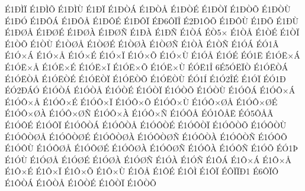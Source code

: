 {^^c91^^d0^^cc^^cf
^^c91^^d0^^cc^^d5
^^c91^^d0^^cc^^d9
^^c91^^d0^^cf
^^c91^^d0^^d2^^c1
^^c91^^d0^^d2^^c5
^^c91^^d0^^d2^^c9
^^c91^^d0^^d2^^cf
^^c91^^d0^^d2^^d5
^^c91^^d0^^d2^^d9
^^c91^^d0^^d3
^^c91^^d0^^d4^^c1
^^c91^^d0^^d4^^c5
^^c91^^d0^^d4^^c9
^^c91^^d0^^d4^^cf
^^c9^^d06^^d4^^cf^^ce
^^c92^^d01^^d4^^d5
^^c91^^d0^^d4^^d9
^^c91^^d0^^d5
^^c91^^d0^^d9
^^c91^^d0^^d8^^c5
^^c91^^d0^^d8^^c9
^^c91^^d0^^d8^^c0
^^c91^^d0^^d8^^d1
^^c91^^d0^^c0
^^c91^^d0^^d1
^^c91^^d2^^c1
^^c9^^d25^^d7
^^c91^^d2^^c5
^^c91^^d2^^c9
^^c91^^d2^^cf
^^c91^^d2^^d5
^^c91^^d2^^d9
^^c91^^d2^^d8^^c5
^^c91^^d2^^d8^^c9
^^c91^^d2^^d8^^c0
^^c91^^d2^^d8^^d1
^^c91^^d2^^c0
^^c91^^d2^^d1
^^c91^^d3^^c1
^^c9^^d31^^c2
^^c91^^d3^^d7^^c1
^^c91^^d3^^d7^^c5
^^c91^^d3^^d7^^c9
^^c91^^d3^^d7^^cf
^^c91^^d3^^d7^^d5
^^c91^^d3^^d7^^d9
^^c91^^d3^^c5
^^c91^^d3^^c9
^^c9^^d31^^cb
^^c91^^d3^^cb^^d7^^c1
^^c91^^d3^^cb^^d7^^c5
^^c91^^d3^^cb^^d7^^c9
^^c91^^d3^^cb^^d7^^cf
^^c91^^d3^^cb^^d7^^d5
^^c91^^d3^^cb^^d7^^d9
^^c9^^d3^^cb1^^ce
6^^c95^^d3^^cb^^cf^^d2
^^c91^^d3^^cb^^d2^^c1
^^c91^^d3^^cb^^d2^^c5
^^c91^^d3^^cb^^d2^^c9
^^c91^^d3^^cb^^d2^^cf
^^c91^^d3^^cb^^d2^^d5
^^c91^^d3^^cb^^d2^^d9
^^c9^^d31^^cd
^^c91^^d32^^ce^^c9
^^c91^^d3^^cf
^^c9^^d31^^d0
^^c9^^d32^^d0^^c1^^d3
^^c91^^d3^^d2^^c1
^^c91^^d3^^d2^^c5
^^c91^^d3^^d2^^c9
^^c91^^d3^^d2^^cf
^^c91^^d3^^d2^^d5
^^c91^^d3^^d2^^d9
^^c91^^d3^^d4^^c1
^^c91^^d3^^d4^^d7^^c1
^^c91^^d3^^d4^^d7^^c5
^^c91^^d3^^d4^^d7^^c9
^^c91^^d3^^d4^^d7^^cf
^^c91^^d3^^d4^^d7^^d5
^^c91^^d3^^d4^^d7^^d9
^^c91^^d3^^d4^^d7^^d8^^c5
^^c91^^d3^^d4^^d7^^d8^^c9
^^c91^^d3^^d4^^d7^^d8^^c0
^^c91^^d3^^d4^^d7^^d8^^d1
^^c91^^d3^^d4^^d7^^c0
^^c91^^d3^^d4^^d7^^d1
^^c91^^d3^^d4^^c5
^^c9^^d31^^d4^^c5^^cb
^^c9^^d35^^d4^^c5^^c3
^^c91^^d3^^d4^^c9
^^c91^^d3^^d4^^cf
^^c91^^d3^^d4^^d2^^c1
^^c91^^d3^^d4^^d2^^c5
^^c91^^d3^^d4^^d2^^c9
^^c91^^d3^^d4^^d2^^cf
^^c91^^d3^^d4^^d2^^d5
^^c91^^d3^^d4^^d2^^d9
^^c91^^d3^^d4^^d2^^d8^^c5
^^c91^^d3^^d4^^d2^^d8^^c9
^^c91^^d3^^d4^^d2^^d8^^c0
^^c91^^d3^^d4^^d2^^d8^^d1
^^c91^^d3^^d4^^d2^^c0
^^c91^^d3^^d4^^d2^^d1
^^c91^^d3^^d4^^d5
^^c91^^d3^^d4^^d9
^^c91^^d3^^d4^^d8^^c5
^^c91^^d3^^d4^^d8^^c9
^^c91^^d3^^d4^^d8^^c0
^^c91^^d3^^d4^^d8^^d1
^^c91^^d3^^d4^^c0
^^c91^^d3^^d4^^d1
^^c91^^d3^^d5
^^c9^^d31^^de
^^c91^^d3^^d9
^^c91^^d3^^d8^^c5
^^c91^^d3^^d8^^c9
^^c91^^d3^^d8^^c0
^^c91^^d3^^d8^^d1
^^c91^^d3^^c0
^^c91^^d3^^d1
^^c91^^d4^^c1
^^c91^^d4^^d7^^c1
^^c91^^d4^^d7^^c5
^^c91^^d4^^d7^^c9
^^c91^^d4^^d7^^cf
^^c91^^d4^^d7^^d5
^^c91^^d4^^d7^^d9
^^c91^^d4^^c5
^^c91^^d4^^c9
^^c91^^d4^^cc
^^c91^^d4^^cf
^^c9^^d4^^cf^^cf^^d01
^^c96^^d4^^cf^^d4
^^c91^^d4^^d2^^c1
^^c91^^d4^^d2^^c5
^^c91^^d4^^d2^^c9
^^c91^^d4^^d2^^cf
^^c91^^d4^^d2^^d5
}
